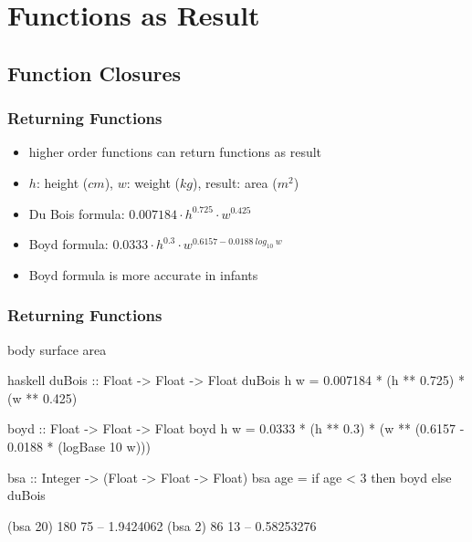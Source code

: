 \documentclass[dvipsnames]{beamer}
\theoremstyle{plain}
\begin{document}
\section{Functions as Result}

\subsection{Function Closures}

\begin{frame}
  \frametitle{Returning Functions}

  \begin{itemize}
    \item higher order functions can return functions as result
  \end{itemize}

  \begin{example}
    \begin{itemize}
      \item $h$: height ($cm$), $w$: weight ($kg$), result: area ($m^2$)
      \smallskip
      \item Du Bois formula:
        $0.007184 \cdot h^{0.725} \cdot w^{0.425}$\\
      \smallskip
      \item Boyd formula:
        $0.0333 \cdot h^{0.3} \cdot w^{0.6157 - 0.0188~log_{10}~w}$
      \smallskip
      \item Boyd formula is more accurate in infants
    \end{itemize}
  \end{example}
\end{frame}

\begin{frame}[fragile]
  \frametitle{Returning Functions}

  \begin{exampleblock}{body surface area}
    \begin{pygments}{haskell}
duBois :: Float -> Float -> Float
duBois h w = 0.007184 * (h ** 0.725) * (w ** 0.425)

boyd :: Float -> Float -> Float
boyd h w = 0.0333 * (h ** 0.3) *
           (w ** (0.6157 - 0.0188 * (logBase 10 w)))

bsa :: Integer -> (Float -> Float -> Float)
bsa age = if age < 3 then boyd else duBois

(bsa 20) 180 75  -- 1.9424062
(bsa 2) 86 13    -- 0.58253276
    \end{pygments}
  \end{exampleblock}
\end{frame}
\end{document}
